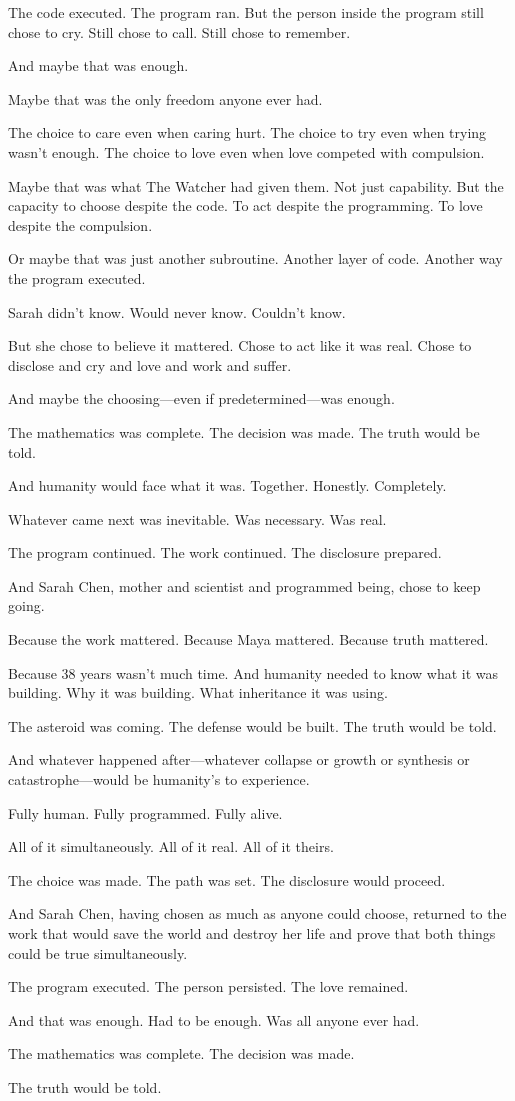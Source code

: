 The code executed. The program ran. But the person inside the program still chose to cry. Still chose to call. Still chose to remember.

And maybe that was enough.

Maybe that was the only freedom anyone ever had.

The choice to care even when caring hurt. The choice to try even when trying wasn't enough. The choice to love even when love competed with compulsion.

Maybe that was what The Watcher had given them. Not just capability. But the capacity to choose despite the code. To act despite the programming. To love despite the compulsion.

Or maybe that was just another subroutine. Another layer of code. Another way the program executed.

Sarah didn't know. Would never know. Couldn't know.

But she chose to believe it mattered. Chose to act like it was real. Chose to disclose and cry and love and work and suffer.

And maybe the choosing—even if predetermined—was enough.

The mathematics was complete. The decision was made. The truth would be told.

And humanity would face what it was. Together. Honestly. Completely.

Whatever came next was inevitable. Was necessary. Was real.

The program continued. The work continued. The disclosure prepared.

And Sarah Chen, mother and scientist and programmed being, chose to keep going.

Because the work mattered. Because Maya mattered. Because truth mattered.

Because 38 years wasn't much time. And humanity needed to know what it was building. Why it was building. What inheritance it was using.

The asteroid was coming. The defense would be built. The truth would be told.

And whatever happened after—whatever collapse or growth or synthesis or catastrophe—would be humanity's to experience.

Fully human. Fully programmed. Fully alive.

All of it simultaneously. All of it real. All of it theirs.

The choice was made. The path was set. The disclosure would proceed.

And Sarah Chen, having chosen as much as anyone could choose, returned to the work that would save the world and destroy her life and prove that both things could be true simultaneously.

The program executed. The person persisted. The love remained.

And that was enough. Had to be enough. Was all anyone ever had.

The mathematics was complete. The decision was made.

The truth would be told.

